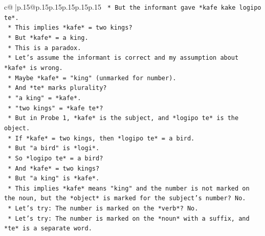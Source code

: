 \documentclass{article}
\begin{document}
{\begin{supertabular}{c@{$\;$}|p{.15\linewidth}@{}p{.15\linewidth}p{.15\linewidth}p{.15\linewidth}p{.15\linewidth}p{.15\linewidth}}
{{{\texttt{                                                    *   But the informant gave *kafe kake logipo te*.} \\
\texttt{                                                    *   This implies *kafe* = two kings?} \\
\texttt{                                                    *   But *kafe* = a king.} \\
\texttt{                                                    *   This is a paradox.} \\
\texttt{                                                    *   Let's assume the informant is correct and my assumption about *kafe* is wrong.} \\
\texttt{                                                    *   Maybe *kafe* = "king" (unmarked for number).} \\
\texttt{                                                    *   And *te* marks plurality?} \\
\texttt{                                                    *   "a king" = *kafe*.} \\
\texttt{                                                    *   "two kings" = *kafe te*?} \\
\texttt{                                                    *   But in Probe 1, *kafe* is the subject, and *logipo te* is the object.} \\
\texttt{                                                    *   If *kafe* = two kings, then *logipo te* = a bird.} \\
\texttt{                                                    *   But "a bird" is *logi*.} \\
\texttt{                                                    *   So *logipo te* = a bird?} \\
\texttt{                                                    *   And *kafe* = two kings?} \\
\texttt{                                                    *   But "a king" is *kafe*.} \\
\texttt{                                                    *   This implies *kafe* means "king" and the number is not marked on the noun, but the *object* is marked for the subject's number? No.} \\
\texttt{                                                    *   Let's try: The number is marked on the *verb*? No.} \\
\texttt{                                                    *   Let's try: The number is marked on the *noun* with a suffix, and *te* is a separate word.} \\
}}}
\end{supertabular}}
\end{document}
